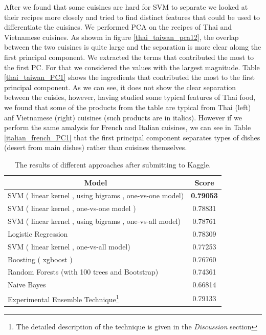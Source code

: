 \documentclass[prodmode,acmtap]{acmlarge}
\newcommand*{\myalign}[2]{\multicolumn{1}{#1}{#2}}
\begin{document}
After we found that some cuisines are hard for SVM to separate we looked at their recipes more closely and tried to find distinct features that could be used to differentiate the cuisines. We performed PCA on the recipes of Thai and Vietnamese cuisines. As showm in figure \ref{thai_taiwan_pca12}, the overlap between the two cuisines is quite large and the separation is more clear alomg the first principal component. We extracted the terms that contributed the most to the first PC. For that we considered the values with the largest magnitude. Table \ref{thai_taiwan_PC1} shows the ingredients that contributed the most to the first principal component. As we can see, it does not show the clear separation between the cuisies, however, having studied some typical features of Thai food, we found that some of the products from the table are typical from Thai (left) anf Vietnamese (right) cuisines (such products are in italics). However if we perform the same amalysis for French and Italian cuisines, we can see in Table \ref{italian_french_PC1} that the first principal component separates types of dishes (desert from main dishes) rather than cuisines themselves. 


\begin {table}
	\centering
	\begin{tabular}{|l|c|}
		\hline
		\myalign{|c|}{Model} & \myalign{|c|}{Score} \\ 
		\hline
		SVM ( linear kernel , using bigrams , one-vs-one model) & \textbf{0.79053} \\
		\hline
		SVM ( linear kernel , one-vs-one model ) & 0.78831 \\
		\hline
		SVM ( linear kernel , using bigrams , one-vs-all model) & 0.78761 \\
		\hline
		Logistic Regression & 0.78309 \\
		\hline
		SVM ( linear kernel , one-vs-all model) & 0.77253 \\
		\hline
		Boosting ( xgboost ) & 0.76760 \\
		\hline
		Random Forests (with 100 trees and Bootstrap) & 0.74361\\
		\hline
		Naive Bayes & 0.66814 \\
		\hline
		Experimental Ensemble Technique\footnote{The detailed description of the technique is given in the \textit{Discussion} section} & 0.79133 \\
		\hline		

	\end{tabular}

\caption{ The results of different approaches after submitting to Kaggle.}
\label{resultstable}
\end {table}
\end{document}
